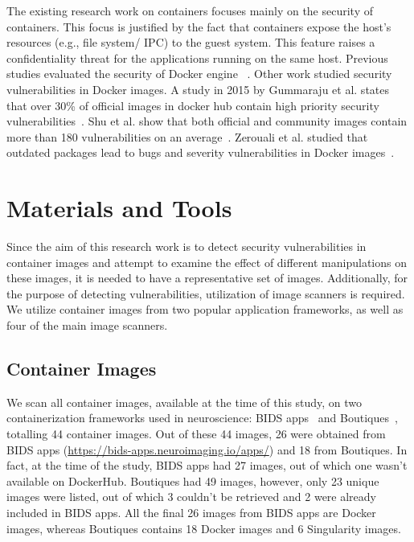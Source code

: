 \documentclass[a4paper,num-refs]{oup-contemporary}
\begin{document}
The existing research work on containers focuses mainly on the security of containers.
This focus is justified by the fact that containers expose the host's resources
(e.g., file system/ IPC) to the guest system. This feature raises a confidentiality
threat for the applications running on the same host. Previous studies evaluated
the security of Docker engine ~\cite{martin2018docker, sultan2019container, combe2016docker, bui2015analysis}.
Other work studied security vulnerabilities in Docker images. A study in 2015 by Gummaraju et al.
states that over 30\% of official images in docker hub contain high priority 
security vulnerabilities~\cite{gummaraju2015over}. Shu et al. show that both official and community images 
contain more than 180 vulnerabilities on an average~\cite{Shu2017}.
Zerouali et al. studied that 
outdated packages lead to bugs and severity vulnerabilities in Docker
images~\cite{zerouali2019relation}.

\section{Materials and Tools}

Since the aim of this research work is to detect security vulnerabilities
in container images and attempt to examine the effect of different
manipulations on these images, it is needed to have a representative set of
images. Additionally, for the purpose of detecting vulnerabilities,
utilization of image scanners is required. We utilize container
images from two popular application frameworks, as well as
four of the main image scanners.

\subsection{Container Images}

We scan all container images, available at the time of this study, on two containerization frameworks
used in neuroscience: BIDS
apps~\cite{gorgolewski2017bids} and Boutiques~\cite{glatard2018boutiques}, totalling
44 container images.
Out of these 44 images, 26 were obtained from BIDS apps
(\url{https://bids-apps.neuroimaging.io/apps/}) 
and 18 from Boutiques. In fact, at the time of the study, BIDS apps had 27 images,
out of which one wasn't available on DockerHub. Boutiques had 49 images,
however, only 23 unique images were listed, out of which 3 couldn't be retrieved and 2
were already included in BIDS apps. All the final 26 images
from BIDS apps are Docker images, whereas Boutiques contains 18 Docker images
and 6 Singularity images.
\end{document}
